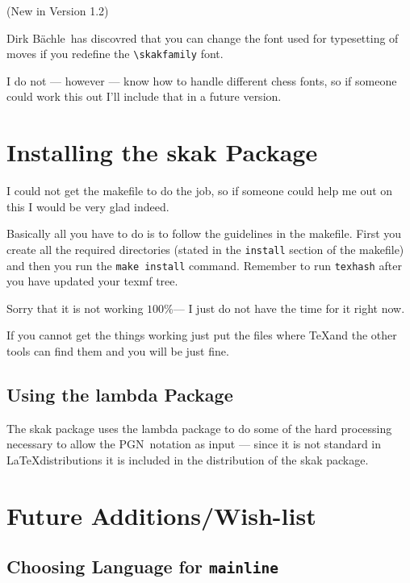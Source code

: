 \documentclass[11pt,twocolumn]{article}
\newcommand{\package}[1]{\textsf{#1}}
\newcommand{\pgn}{PGN\ }
\newcommand{\Dirk}{Dirk B\"achle\ }
\begin{document}
(New in Version 1.2)

\Dirk has discovred that you can change the font used for typesetting
of moves if you redefine the \verb|\skakfamily| font.

I do not --- however --- know how to handle different chess fonts, so
if someone could work this out I'll include that in a future version.


\section{Installing the \package{skak} Package}
\label{sec:install}

I could not get the makefile to do the job, so if someone could help
me out on this I would be very glad indeed.

Basically all you have to do is to follow the guidelines in the
makefile. First you create all the required directories (stated in the
\texttt{install} section of the makefile) and then you run the
\texttt{make install} command. Remember to run \texttt{texhash} after
you have updated your texmf tree.

Sorry that it is not working $100\%$--- I just do not have the time for
it right now.

If you cannot get the things working just put the files where \TeX and
the other tools can find them and you will be just fine. 


\subsection{Using the \package{lambda} Package}
\label{sec:using-lambda}

The \package{skak} package uses the \package{lambda} package to do
some of the hard processing necessary to allow the \pgn notation as
input --- since it is not standard in \LaTeX distributions it is
included in the distribution of the \package{skak} package.


\section{Future Additions/Wish-list}
\label{sec:future-additions}


\subsection{Choosing Language for \texttt{mainline}}\label{sec:choos-lang-mainline}
\end{document}
